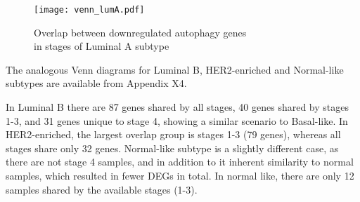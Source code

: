 \begin{wrapfigure}{L}{0.45\textwidth}
        \hfill
        \captionsetup{justification=centering}
        \centerline{ \texttt{[image: venn\_lumA.pdf]}}
        \label{fig:vennluma}
        \vspace*{-8mm}
        \caption[Overlap between downregulated autophagy genes in stages of Luminal A subtype]{Overlap between downregulated autophagy genes \\in stages of Luminal A subtype}
        \end{wrapfigure}
       

The analogous Venn diagrams for Luminal B, HER2-enriched and Normal-like subtypes are available from Appendix X4.

In Luminal B there are 87 genes shared by all stages, 40 genes shared by stages 1-3, and 31 genes unique to stage 4, showing a similar scenario to Basal-like. In HER2-enriched, the largest overlap group is stages 1-3 (79 genes), whereas all stages share only 32 genes. Normal-like subtype is a slightly different case, as there are not stage 4 samples, and in addition to it inherent similarity to normal samples, which resulted in fewer DEGs in total. In normal like, there are only 12 samples shared by the available stages (1-3). 



